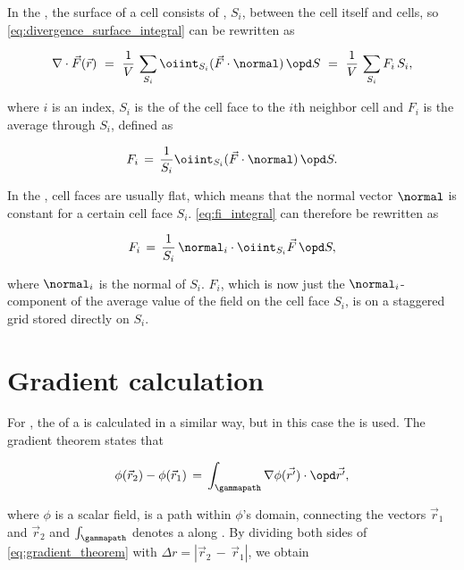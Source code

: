 In the \FVM, the surface of a cell consists of , $S_i$, between the cell itself and \neighboring cells, so \eqref{eq:divergence_surface_integral} can be rewritten as

\begin{equation} \label{eq:divergence_cell_face_sum}
\nabla\cdot\vec{F}(\vec{r})\ =\ \frac{1}{V}\,\sum_{S_i} \oiint_{S_i}(\vec{F}\cdot\normal)\,\opd S\ =\ \frac{1}{V}\,\sum_{S_i} F_i\,S_i,
\end{equation}

where $i$ is an index, $S_i$ is the \area of the cell face to the $i$th neighbor cell and $F_i$ is the average  through $S_i$, defined as

\begin{equation} \label{eq:fi_integral}
F_i \,=\, \frac{1}{S_i}\oiint_{S_i}(\vec{F}\cdot\normal)\,\opd S.
\end{equation}

In the \FVM, cell faces are usually flat, which means that the normal vector $\normal$ is constant for a certain cell face $S_i$. \eqref{eq:fi_integral} can therefore be rewritten as

\begin{equation} \label{eq:fi_flat_cell_face}
F_i \,=\, \frac{1}{S_i}\,\normal_i\cdot\oiint_{S_i}\vec{F}\,\opd S,
\end{equation}

where $\normal_i$ is the normal of $S_i$. $F_i$, which is now just the $\normal_i$-component of the average value of the field on the cell face $S_i$, is on a staggered grid stored directly on $S_i$.

\section{Gradient calculation}

For , the \gradient of a  is calculated in a similar way, but in this case the  is used. The gradient theorem states that

\begin{equation} \label{eq:gradient_theorem}
\phi(\vec{r}_2)-\phi(\vec{r}_1) \,=\, \int_\gammapath\nabla\phi(\vec{r'})\cdot \opd\vec{r'},
\end{equation}

where $\phi$ is a scalar field, \textgammapath is a path within $\phi$'s domain, connecting the vectors $\vec{r}_1$ and $\vec{r}_2$ and $\int_\gammapath$ denotes a  along \textgammapath. By dividing both sides of \eqref{eq:gradient_theorem} with \mbox{$\Delta r = |\vec{r}_2\,-\,\vec{r}_1|$}, we obtain

